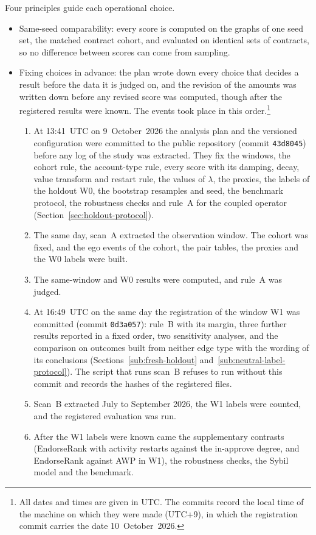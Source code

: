 Four principles guide each operational choice.
\begin{itemize}
\item Same-seed comparability: every score is computed on the graphs of one seed set, the matched contract cohort, and evaluated on identical sets of contracts, so no difference between scores can come from sampling.
\item Fixing choices in advance: the plan wrote down every choice that decides a result before the data it is judged on, and the revision of the amounts was written down before any revised score was computed, though after the registered results were known. The events took place in this order.\footnote{All dates and times are given in UTC. The commits record the local time of the machine on which they were made (UTC+9), in which the registration commit carries the date 10~October~2026.}
\begin{enumerate}
\item At 13:41~UTC on 9~October~2026 the analysis plan and the versioned configuration were committed to the public repository (commit \texttt{43d8045}) before any log of the study was extracted. They fix the windows, the cohort rule, the account-type rule, every score with its damping, decay, value transform and restart rule, the values of $\lambda$, the proxies, the labels of the holdout W0, the bootstrap resamples and seed, the benchmark protocol, the robustness checks and rule~A for the coupled operator (Section~\ref{sec:holdout-protocol}).
\item The same day, scan~A extracted the observation window. The cohort was fixed, and the ego events of the cohort, the pair tables, the proxies and the W0 labels were built.
\item The same-window and W0 results were computed, and rule~A was judged.
\item At 16:49~UTC on the same day the registration of the window W1 was committed (commit \texttt{0d3a057}): rule~B with its margin, three further results reported in a fixed order, two sensitivity analyses, and the comparison on outcomes built from neither edge type with the wording of its conclusions (Sections~\ref{sub:fresh-holdout} and~\ref{sub:neutral-label-protocol}). The script that runs scan~B refuses to run without this commit and records the hashes of the registered files.
\item Scan~B extracted July to September 2026, the W1 labels were counted, and the registered evaluation was run.
\item After the W1 labels were known came the supplementary contrasts (EndorseRank with activity restarts against the in-approve degree, and EndorseRank against AWP in W1), the robustness checks, the Sybil model and the benchmark.

\end{enumerate}
\end{itemize}
